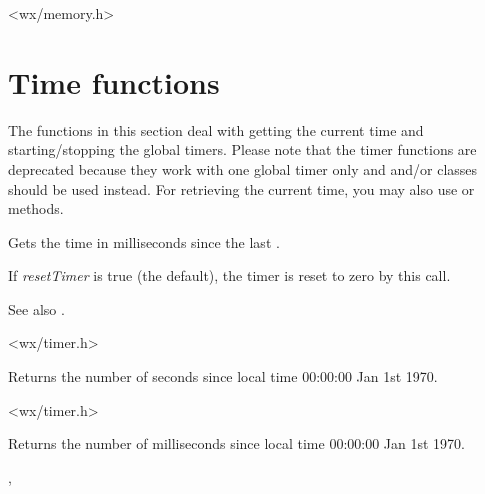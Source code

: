 <wx/memory.h>



\section{Time functions}\label{timefunctions}

The functions in this section deal with getting the current time and
starting/stopping the global timers. Please note that the timer functions are
deprecated because they work with one global timer only and
 and/or  classes
should be used instead. For retrieving the current time, you may also use
 or
 methods.


\label{wxgetelapsedtime}


Gets the time in milliseconds since the last .

If {\it resetTimer} is true (the default), the timer is reset to zero
by this call.

See also .


<wx/timer.h>


\label{wxgetlocaltime}


Returns the number of seconds since local time 00:00:00 Jan 1st 1970.




<wx/timer.h>


\label{wxgetlocaltimemillis}


Returns the number of milliseconds since local time 00:00:00 Jan 1st 1970.


,\\


